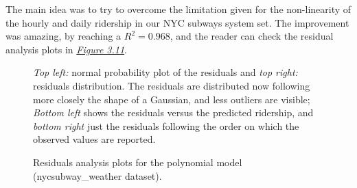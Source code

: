 \documentclass[a4paper,12pt,english]{sphinxmanual}
\begin{document}
The main idea was to try to overcome the limitation given for the non-linearity
of the hourly and daily ridership in our NYC subways system set. The improvement
was amazing, by reaching a \(R^2 = 0.968\), and the reader can check the
residual analysis plots in {\hyperref[section2:figure311]{\emph{Figure 3.11}}}.
\begin{figure}[htbp]
\centering
\capstart

\caption{Residuals analysis plots for the polynomial model (nycsubway\_weather dataset).}{\small 
\emph{Top left:} normal probability plot of the residuals and \emph{top right:} residuals
distribution. The residuals are distributed now following more closely the shape
of a Gaussian, and less outliers are visible; \emph{Bottom left} shows the residuals
versus the predicted ridership, and \emph{bottom right} just the residuals following
the order on which the observed values are reported.
}\label{section2:figure311}\end{figure}
\end{document}
